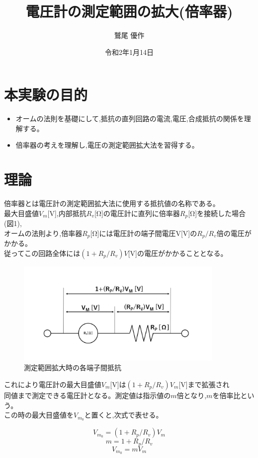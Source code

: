 \documentclass[titlepage]{jarticle}
\title{電圧計の測定範囲の拡大(倍率器)}
\author{鷲尾 優作}
\date{令和2年1月14日}
\begin{document}
\maketitle

\section{本実験の目的}
\begin{itemize}
    \item オームの法則を基礎にして,抵抗の直列回路の電流,電圧,合成抵抗の関係を理解する。
    \item 倍率器の考えを理解し,電圧の測定範囲拡大法を習得する。
\end{itemize}

\section{理論}
倍率器とは電圧計の測定範囲拡大法に使用する抵抗値の名称である。\\
最大目盛値$V_m$[V],内部抵抗$R_v$[Ω]の電圧計に直列に倍率器$R_p$[Ω]を接続した場合(図1),\\
オームの法則より,倍率器$R_p$[Ω]には電圧計の端子間電圧V[V]の$R_p/R_v$倍の電圧がかかる。\\
従ってこの回路全体には$(1+R_p/R_v)V$[V]の電圧がかかることとなる。\\
\begin{figure}[H]
    \begin{center}
        \includegraphics[width=10cm]{image/image01.png}
        \caption{測定範囲拡大時の各端子間抵抗}
    \end{center}
\end{figure}
これにより電圧計の最大目盛値$V_m$[V]は$(1+R_p/R_v)V_m$[V]まで拡張され\\
同値まで測定できる電圧計となる。測定値は指示値の$m$倍となり,$m$を倍率比という。\\
この時の最大目盛値を$V_{m_0}$と置くと,次式で表せる。

\begin{equation}
    V_{m_0}=(1+R_p/R_v)V_m
\end{equation}
\begin{equation}
    m=1+R_p/R_v
\end{equation}
\begin{equation}
    V_{m_0}=mV_m
\end{equation}
\end{document}
